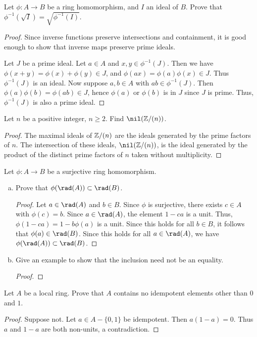 \documentclass{article}
\begin{document}
 Let $\phi: A \to B$ be a ring homomorphism, and $I$ an ideal of $B$. Prove that $\phi^{-1}(\sqrt I) = \sqrt{\phi^{-1}(I)}$.

\begin{proof}

Since inverse functions preserve intersections and containment, it is good enough to show that inverse maps preserve prime ideals. 

Let $J$ be a prime ideal.  Let $a \in A$ and $x,y \in \phi^{-1}(J)$.  Then we have $\phi(x + y) = \phi(x) + \phi(y) \in J$, and $\phi(ax) = \phi(a)\phi(x) \in J$.  Thus $\phi^{-1}(J)$ is an ideal.   Now suppose $a,b \in A$ with $ab \in \phi^{-1}(J)$.  Then $\phi(a)\phi(b) = \phi(ab) \in J$,  hence $\phi(a)$ or $\phi(b)$ is in $J$ since $J$ is prime.  Thus, $\phi^{-1}(J)$ is also a prime ideal.
\end{proof}

 Let $n$ be a positive integer, $n \ge 2$. Find $\nil(\Z/(n))$.
\begin{proof}
The maximal ideals of $\mathbb{Z}/(n)$ are the ideals generated by the prime factors of $n$.  The intersection of these ideals, $\nil(\Z/(n))$,  is the ideal generated by the product of the distinct prime factors of $n$ taken without multiplicity.
\end{proof}

 Let $\phi: A \to B$ be a surjective ring homomorphism.
\begin{enumerate}[(a)]
\item Prove that $\phi(\rad(A)) \subset \rad(B)$.
\begin{proof}
Let $a \in \rad(A)$ and $b \in B$.  Since $\phi$ is surjective, there exists $c \in A$ with $\phi(c) = b$.  Since $a \in \rad(A)$, the element $1 - ca$ is a unit. Thus, $\phi(1 - ca) = 1 - b\phi(a)$ is a unit.  Since this holds for all $b \in B$, it follows that $\phi(a) \in \rad(B)$.  Since this holds for all $a \in \rad(A)$, we have $\phi(\rad(A)) \subset \rad(B)$.
\end{proof}
\item Give an example to show that the inclusion need not be an equality.
\begin{proof}

\end{proof}
\end{enumerate}

 Let $A$ be a local ring.  Prove that $A$ contains no idempotent elements other than $0$ and $1$.
\begin{proof}
Suppose not.  Let $a \in A - \{0,1\}$ be idempotent.  Then $a(1-a) = 0$.  Thus $a$ and $1-a$ are both non-units, a contradiction.
\end{proof}
\end{document}
